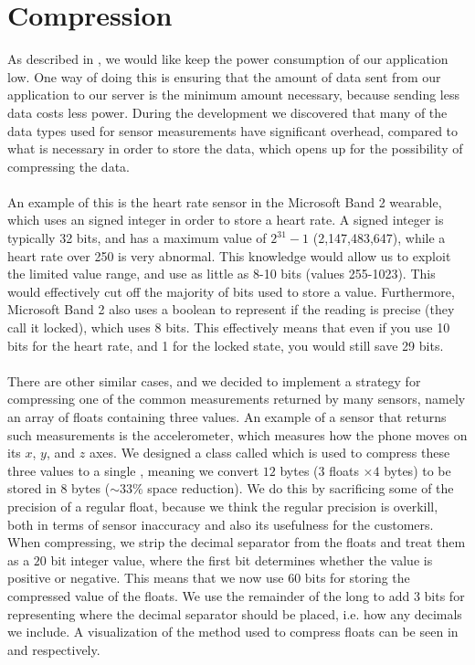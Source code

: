 
\section{Compression}
\label{sec:compression}

As described in , we would like keep the power consumption of our application low. One way of doing this is ensuring that the amount of data sent from our application to our server is the minimum amount necessary, because sending less data costs less power. During the development we discovered that many of the data types used for sensor measurements have significant overhead, compared to what is necessary in order to store the data, which opens up for the possibility of compressing the data. 
\\\\
An example of this is the heart rate sensor in the Microsoft Band 2 wearable, which uses an signed integer in order to store a heart rate. A signed integer is typically 32 bits, and has a maximum value of $2^{31} - 1$ (2,147,483,647), while a heart rate over 250 is very abnormal. This knowledge would allow us to exploit the limited value range, and use as little as 8-10 bits (values 255-1023). This would effectively cut off the majority of bits used to store a value. Furthermore, Microsoft Band 2 also uses a boolean to represent if the reading is precise (they call it locked), which uses 8 bits. This effectively means that even if you use 10 bits for the heart rate, and 1 for the locked state, you would still save 29 bits.    
\\\\
There are other similar cases, and we decided to implement a strategy for compressing one of the common measurements returned by many sensors, namely an array of floats containing three values. An example of a sensor that returns such measurements is the accelerometer, which measures how the phone moves on its $x$, $y$, and $z$ axes. We designed a class called  which is used to compress these three values to a single , meaning we convert $12$ bytes ($3$ floats $\times 4$ bytes) to be stored in $8$ bytes ($\sim 33\%$ space reduction). We do this by sacrificing some of the precision of a regular float, because we think the regular precision is overkill, both in terms of sensor inaccuracy and also its usefulness for the customers. When compressing, we strip the decimal separator from the floats and treat them as a $20$ bit integer value, where the first bit determines whether the value is positive or negative. This means that we now use $60$ bits for storing the compressed value of the floats. We use the remainder of the long to add 3 bits for representing where the decimal separator should be placed, i.e. how any decimals we include. A visualization of the method used to compress floats can be seen in  and  respectively.

